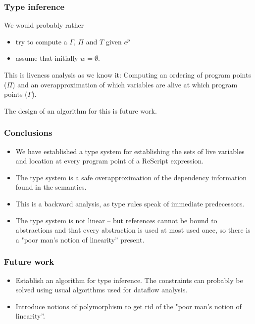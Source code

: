 \documentclass{beamer}
\begin{document}
\begin{frame}
  \frametitle{Type inference}

  We would probably rather

  \begin{itemize}
  \item try to compute a $\Gamma$, $\Pi$ and $T$
    given $e^p$   
  \item assume that initially $w = \emptyset$.
  \end{itemize}

  This is liveness analysis as we know it: Computing an ordering of
  program points ($\Pi$) and an overapproximation of which variables
  are alive at which program points ($\Gamma$).

  The design of an algorithm for this is future work.
\end{frame}

\begin{frame}
  \frametitle{Conclusions}

  \begin{itemize}
 
  \item We have established a type system for establishing the sets of
    live variables and location at every program point of a ReScript
    expression.
  \item The type system is a safe overapproximation of the dependency
    information found in the semantics.
  \item This is a backward analysis, as type rules speak of immediate
    predecessors.
  \item The type system is not linear -- but references cannot be bound to
abstractions and that every abstraction is used at most used once, so
there is a "poor man's notion of linearity'' present.
  \end{itemize}
\end{frame}

\begin{frame}
  \frametitle{Future work}

  \begin{itemize}
  \item Establish an algorithm for type inference. The constraints can
    probably be solved using usual algorithms used for dataflow analysis.
  \item Introduce notions of polymorphism to get rid of the "poor man's notion of linearity''.
  \end{itemize}
\end{frame}
\end{document}
